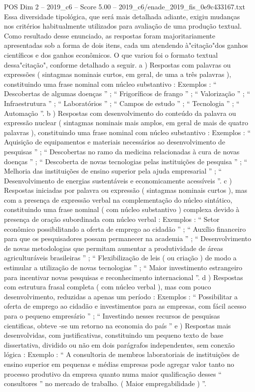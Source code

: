 \begin{textsample}{POS Dim 2 – 2019\_c6 – Score 5.00 – 2019\_c6/enade\_2019\_fis\_0e9c433167.txt}
Essa diversidade tipológica, que será mais detalhada adiante, exigiu mudanças nos critérios habitualmente utilizados para avaliação de uma produção textual.
Como resultado desse enunciado, as respostas foram majoritariamente apresentadas sob a forma de dois itens, cada um atendendo à"citação"dos ganhos científicos e dos ganhos econômicos.
O que variou foi o formato textual dessa"citação", conforme detalhado a seguir. a ) Respostas com palavras ou expressões ( sintagmas nominais curtos, em geral, de uma a três palavras ), constituindo uma frase nominal com núcleo substantivo : Exemplos : “ Descobertas de algumas doenças ” ; “ Frigoríficos de frango ” ; “ Valorização ” ; “ Infraestrutura ” ; “ Laboratórios ” ; “ Campos de estudo ” ; “ Tecnologia ” ; “ Automação ”. b ) Respostas com desenvolvimento do conteúdo da palavra ou expressão nuclear ( sintagmas nominais mais amplos, em geral de mais de quatro palavras ), constituindo uma frase nominal com núcleo substantivo : Exemplos : “ Aquisição de equipamentos e materiais necessários ao desenvolvimento de pesquisas ” ; “ Descobertas no ramo da medicina relacionadas à cura de novas doenças ” ; “ Descoberta de novas tecnologias pelas instituições de pesquisa ” ; “ Melhoria das instituições de ensino superior pela ajuda empresarial ” ; “ Desenvolvimento de energias sustentáveis e economicamente acessíveis ”. c ) Respostas iniciadas por palavra ou expressão ( sintagmas nominais curtos ), mas com a presença de expressão verbal na complementação do núcleo sintático, constituindo uma frase nominal ( com núcleo substantivo ) complexa devido à presença de oração subordinada com núcleo verbal : Exemplos : “ Setor econômico possibilitando a oferta de emprego ao cidadão ” ; “ Auxílio financeiro para que os pesquisadores possam permanecer na academia ” ; “ Desenvolvimento de novas metodologias que permitam aumentar a produtividade de áreas agriculturáveis brasileiras ” ; “ Flexibilização de leis ( ou criação ) de modo a estimular a utilização de novas tecnologias ” ; “ Maior investimento estrangeiro para incentivar novas pesquisas e reconhecimento internacional ”. d ) Respostas com estrutura frasal completa ( com núcleo verbal ), mas com pouco desenvolvimento, reduzidas a apenas um período : Exemplos : “ Possibilitar a oferta de emprego ao cidadão e investimentos para as empresas, com fácil acesso para o pequeno empresário ” ; “ Investindo nesses recursos de pesquisas cientificas, obteve -se um retorno na economia do país ” e ) Respostas mais desenvolvidas, com justificativas, constituindo um pequeno texto de base dissertativa, dividido ou não em dois parágrafos independentes, sem conexão lógica : Exemplo : “ A consultoria de membros laboratoriais de instituições de ensino superior em pequenas e médias empresas pode agregar valor tanto no processo produtivo da empresa quanto numa maior qualificação desses “ consultores ” no mercado de trabalho. ( Maior empregabilidade ) ”.

\end{textsample}
